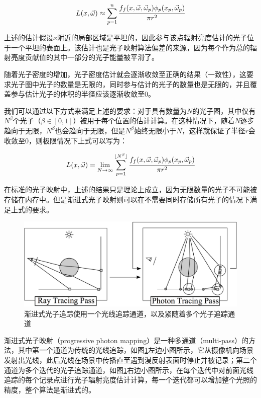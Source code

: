 \begin{equation}
	L(x,\vec{\omega})\approx \sum^{n}_{p=1} \cfrac{f_f(x,\vec{\omega},\vec{\omega}_p)\phi_p(x_p,\vec{\omega}_p)}{\pi r^{2}}
\end{equation}

\noindent 上述的估计假设$x$附近的局部区域是平坦的，因此参与该点辐射亮度估计的光子位于一个平坦的表面上。该估计也是光子映射算法偏差的来源，因为每个作为总的辐射亮度贡献值的其中一部分的光子能量被平滑了。

随着光子密度的增加，光子密度估计就会逐渐收敛至正确的结果（一致性），这要求光子图中光子的数量是无限的，同时参与估计的光子的数量也是无限的，并且覆盖参与估计光子的体积的半径应该逐渐收敛至0。

我们可以通过以下方式来满足上述的要求：对于具有数量为$N$的光子图，其中仅有$N^{\beta}$个光子（$\beta\in[0,1]$）被用于每个位置的估计计算。在这种情况下，随着$N$逐步趋向于无限，$N^{\beta}$也会趋向于无限，但是$N^{\beta}$始终无限小于$N$，这样就保证了半径$r$会收敛至0，则极限情况下上式可以写为\cite{b:RealisticImageSynthesisUsingPhotonMapping}：

\begin{equation}\label{e:pm-consistent-equation}
	L(x,\vec{\omega})=\lim_{N\to\infty} \sum^{\lfloor N^{\beta} \rfloor}_{p=1} \cfrac{f_f(x,\vec{\omega},\vec{\omega}_p)\phi_p(x_p,\vec{\omega}_p)}{\pi r^{2}}
\end{equation}

\noindent 在标准的光子映射中，上述的结果只是理论上成立，因为无限数量的光子不可能被存储在内存中。但是渐进式光子映射则可以在不需要同时存储所有光子的情况下满足上式的要求。

\begin{figure}
	\includegraphics[width=\textwidth]{figures/pm/pm-18}
	\caption{渐进式光子追踪使用一个光线追踪通道，以及紧随着多个光子追踪通道}
	\label{f:pm-progressive-photon-mapping}
\end{figure}

渐进式光子映射（progressive photon mapping）是一种多通道（multi-pass）的方法，其中第一个通道为传统的光线追踪，如图\ref{f:pm-progressive-photon-mapping}左边小图所示，它从摄像机向场景发射出光线，此后光线在场景中传播直至遇到漫反射表面时停止并被记录；第二个通道为多个迭代的光子追踪通道，如图\ref{f:pm-progressive-photon-mapping}右边小图所示，在每个迭代中对前面光线追踪的每个记录点进行光子辐射亮度估计计算，每一个迭代都可以增加整个光照的精度，整个算法是渐进式的。




